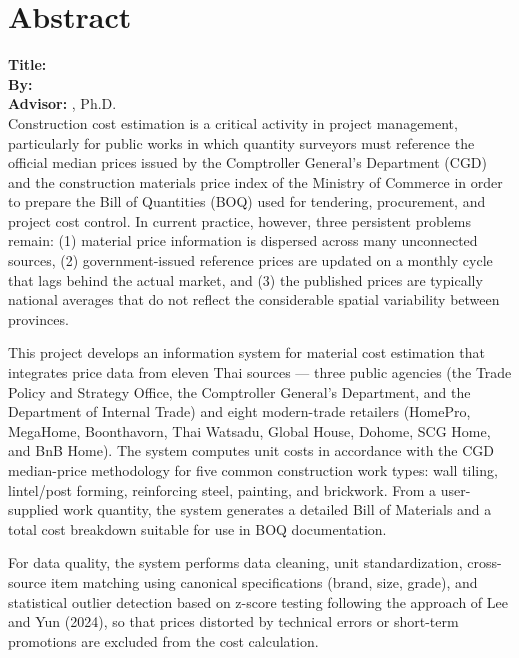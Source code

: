 \chapter*{Abstract}

\noindent\textbf{Title:} \thesistitleEN\\
\textbf{By:} \authornameEN\\
\textbf{Advisor:} \advisorEN, Ph.D.\\

Construction cost estimation is a critical activity in project management,
particularly for public works in which quantity surveyors must reference the
official median prices issued by the Comptroller General's Department (CGD)
and the construction materials price index of the Ministry of Commerce in
order to prepare the Bill of Quantities (BOQ) used for tendering, procurement,
and project cost control. In current practice, however, three persistent
problems remain: (1) material price information is dispersed across many
unconnected sources, (2) government-issued reference prices are updated on
a monthly cycle that lags behind the actual market, and (3) the published
prices are typically national averages that do not reflect the considerable
spatial variability between provinces.

This project develops an information system for material cost estimation
that integrates price data from eleven Thai sources --- three public
agencies (the Trade Policy and Strategy Office, the Comptroller General's
Department, and the Department of Internal Trade) and eight modern-trade
retailers (HomePro, MegaHome, Boonthavorn, Thai Watsadu, Global House,
Dohome, SCG Home, and BnB Home). The system computes unit costs in
accordance with the CGD median-price methodology for five common
construction work types: wall tiling, lintel/post forming, reinforcing
steel, painting, and brickwork. From a user-supplied work quantity, the
system generates a detailed Bill of Materials and a total cost breakdown
suitable for use in BOQ documentation.

For data quality, the system performs data cleaning, unit standardization,
cross-source item matching using canonical specifications (brand, size,
grade), and statistical outlier detection based on z-score testing
following the approach of Lee and Yun (2024), so that prices distorted
by technical errors or short-term promotions are excluded from the cost
calculation.

